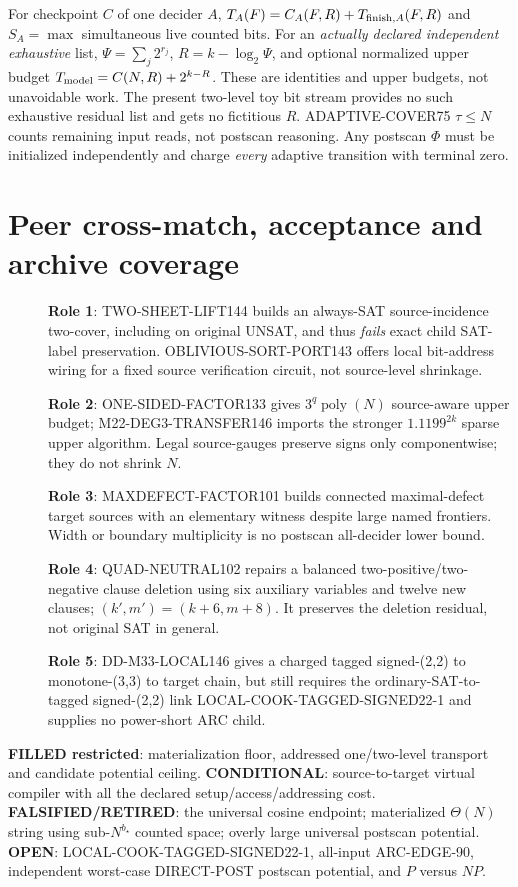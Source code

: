 \documentclass[11pt]{article}
\begin{document}
For checkpoint $C$ of one decider $A$,
$T_A(F)=C_A(F,R)+T_{{\rm finish},A}(F,R)$ and
$S_A=\max$ simultaneous live counted bits. For an \emph{actually
declared independent exhaustive} list, $\Psi=\sum_j2^{r_j}$,
$R=k-\log_2\Psi$, and optional normalized upper budget
$T_{\rm model}=C(N,R)+2^{k-R}$.
These are identities and upper budgets, not unavoidable
work. The present two-level toy bit stream provides no
such exhaustive residual list and gets no fictitious $R$.
ADAPTIVE-COVER75 $\tau\le N$ counts remaining input reads,
not postscan reasoning. Any postscan $\Phi$ must be
initialized independently and charge \emph{every} adaptive
transition with terminal zero.

\section{Peer cross-match, acceptance and archive coverage}
\begin{description}
\item[] \textbf{Role 1}: TWO-SHEET-LIFT144 builds an always-SAT
source-incidence two-cover, including on original UNSAT,
and thus \emph{fails} exact child SAT-label preservation.
OBLIVIOUS-SORT-PORT143 offers local bit-address wiring
for a fixed source verification circuit, not source-level shrinkage.
\item[] \textbf{Role 2}: ONE-SIDED-FACTOR133 gives
$3^q\operatorname{poly}(N)$ source-aware upper budget;
M22-DEG3-TRANSFER146 imports the stronger
$1.1199^{2k}$ sparse upper algorithm. Legal source-gauges
preserve signs only componentwise; they do not shrink $N$.
\item[] \textbf{Role 3}: MAXDEFECT-FACTOR101 builds connected
maximal-defect target sources with an elementary witness
despite large named frontiers. Width or boundary
multiplicity is no postscan all-decider lower bound.
\item[] \textbf{Role 4}: QUAD-NEUTRAL102 repairs a balanced
two-positive/two-negative clause deletion using six
auxiliary variables and twelve new clauses; $(k',m')=(k+6,m+8)$.
It preserves the deletion residual, not original SAT in general.
\item[] \textbf{Role 5}: DD-M33-LOCAL146 gives a charged
tagged signed-(2,2) to monotone-(3,3) to target chain,
but still requires the ordinary-SAT-to-tagged signed-(2,2)
link LOCAL-COOK-TAGGED-SIGNED22-1 and supplies no
power-short ARC child.
\end{description}
\textbf{FILLED restricted}: materialization floor, addressed
one/two-level transport and candidate potential ceiling.
\textbf{CONDITIONAL}: source-to-target virtual compiler
with all the declared setup/access/addressing cost.
\textbf{FALSIFIED/RETIRED}: the universal cosine endpoint;
materialized $\Theta(N)$ string using sub-$N^{b_\star}$
counted space; overly large universal postscan potential.
\textbf{OPEN}: LOCAL-COOK-TAGGED-SIGNED22-1, all-input
ARC-EDGE-90, independent worst-case DIRECT-POST
postscan potential, and $P$ versus $NP$.
\end{document}
